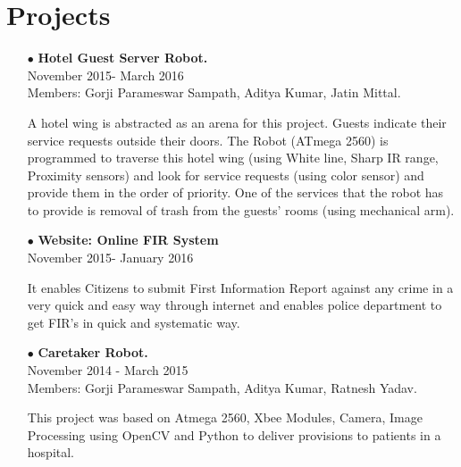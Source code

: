 \documentclass[12pt]{article}
\begin{document}
\section*{Projects}
\begin{itemize}
\item[$\bullet$]\textbf{Hotel Guest Server Robot.}\\November 2015- March 2016\\Members: Gorji Parameswar Sampath, Aditya Kumar, Jatin Mittal.

A hotel wing is abstracted as an arena for this project. Guests indicate their service requests outside their doors. The Robot (ATmega 2560) is programmed to traverse this hotel wing (using White line, Sharp IR range, Proximity sensors) and look for service requests (using color sensor) and provide them in the order of priority. One of the services that the robot has to provide is removal of trash from the guests’ rooms (using mechanical arm).
\item[$\bullet$]\textbf{Website: Online FIR System}\\November 2015- January 2016

It enables Citizens to submit First Information Report against any crime in a very quick and easy way through internet and enables police department to get FIR’s in quick and systematic way.
\item[$\bullet$]\textbf{Caretaker Robot.}\\November 2014 - March 2015 \\Members: Gorji Parameswar Sampath, Aditya Kumar, Ratnesh Yadav.

This project was based on Atmega 2560, Xbee Modules, Camera, Image Processing using OpenCV and Python to deliver provisions to patients in a hospital.
\end{itemize}
\end{document}
